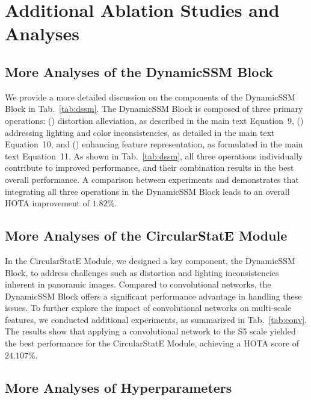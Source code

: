 \section{Additional Ablation Studies and Analyses}
\subsection{More Analyses of the DynamicSSM Block}
We provide a more detailed discussion on the components of the DynamicSSM Block in Tab.~\ref{tab:dssm}. 
The DynamicSSM Block is composed of three primary operations: () distortion alleviation, as described in the main text Equation~9, () addressing lighting and color inconsistencies, as detailed in the main text Equation~10, and () enhancing feature representation, as formulated in the main text Equation~11. 
As shown in Tab.~\ref{tab:dssm}, all three operations individually contribute to improved performance, and their combination results in the best overall performance. 
A comparison between experiments  and  demonstrates that integrating all three operations in the DynamicSSM Block leads to an overall HOTA improvement of $1.82\%$.

\subsection{More Analyses of the CircularStatE Module}
In the CircularStatE Module, we designed a key component, the DynamicSSM Block, to address challenges such as distortion and lighting inconsistencies inherent in panoramic images. Compared to convolutional networks, the DynamicSSM Block offers a significant performance advantage in handling these issues. 
To further explore the impact of convolutional networks on multi-scale features, we conducted additional experiments, as summarized in Tab.~\ref{tab:conv}. 
The results show that applying a convolutional network to the S5 scale yielded the best performance for the CircularStatE Module, achieving a HOTA score of $24.107\%$.






\subsection{More Analyses of Hyperparameters}


